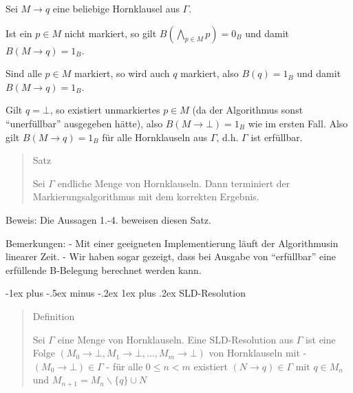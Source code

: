 \documentclass[a4paper]{article}
\makeatletter
\renewcommand{\subsubsection}{\@startsection{subsubsection}{3}{0mm}%
                {-1ex plus -.5ex minus -.2ex}%
                {1ex plus .2ex}%
                {\normalfont\small\bfseries}}
\makeatother
\begin{document}
\begin{multicols}{3}
\begin{enumerate*}
          \begin{itemize*}
            \item
                  Sei $M\rightarrow q$ eine beliebige Hornklausel aus $\Gamma$.
            \item
                  Ist ein $p\in M$ nicht markiert, so gilt
                  $B(\bigwedge_{p\in M} p) = 0_B$ und damit $B(M\rightarrow q) = 1_B$.
            \item
                  Sind alle $p\in M$ markiert, so wird auch $q$ markiert, also
                  $B(q) = 1_B$ und damit $B(M\rightarrow q) = 1_B$.
            \item
                  Gilt $q=\bot$, so existiert unmarkiertes $p\in M$ (da der
                  Algorithmus sonst ``unerfüllbar'' ausgegeben hätte), also
                  $B(M\rightarrow\bot) = 1_B$ wie im ersten Fall. Also gilt
                  $B(M\rightarrow q) = 1_B$ für alle Hornklauseln aus $\Gamma$, d.h.
                  $\Gamma$ ist erfüllbar.
          \end{itemize*}
  \end{enumerate*}

  \begin{quote}
    Satz

    Sei $\Gamma$ endliche Menge von Hornklauseln. Dann terminiert der
    Markierungsalgorithmus mit dem korrekten Ergebnis.
  \end{quote}

  Beweis: Die Aussagen 1.-4. beweisen diesen Satz.

  Bemerkungen: - Mit einer geeigneten Implementierung läuft der
  Algorithmusin linearer Zeit. - Wir haben sogar gezeigt, dass bei Ausgabe
  von ``erfüllbar'' eine erfüllende B-Belegung berechnet werden kann.

  \subsubsection{SLD-Resolution}\label{sld-resolution}

  \begin{quote}
    Definition

    Sei $\Gamma$ eine Menge von Hornklauseln. Eine SLD-Resolution aus
    $\Gamma$ ist eine Folge
    $(M_0\rightarrow\bot,M_1\rightarrow\bot,... ,M_m\rightarrow\bot)$ von
    Hornklauseln mit - $(M_0\rightarrow\bot)\in\Gamma$ - für alle
    $0\leq n<m$ existiert $(N\rightarrow q)\in\Gamma$ mit $q\in M_n$ und
    $M_{n+1} = M_n\backslash\{q\}\cup N$
  \end{quote}


\end{multicols}
\end{document}
